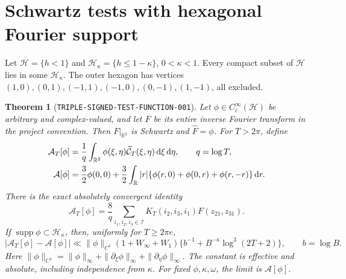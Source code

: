 \documentclass[11pt]{article}
\newtheorem{theorem}[lemma]{Theorem}
\newcommand{\dd}{\,\mathrm d}
\begin{document}
\section{Schwartz tests with hexagonal Fourier support}

Let \(\mathcal H=\{h<1\}\) and
\(\mathcal H_\kappa=\{h\leq1-\kappa\}\), \(0<\kappa<1\).
Every compact subset of \(\mathcal H\) lies in some
\(\mathcal H_\kappa\). The outer hexagon has vertices
\((1,0),(0,1),(-1,1),(-1,0),(0,-1),(1,-1)\), all excluded.

\begin{theorem}[\texttt{TRIPLE-SIGNED-TEST-FUNCTION-001}]
\label{thm:triple-signed-test-function}
Let \(\phi\in C_c^\infty(\mathcal H)\) be arbitrary and complex-valued,
and let \(F\) be its entire inverse Fourier transform in the project
convention. Then \(F|_{\mathbb R^2}\) is Schwartz and \(\widehat F=\phi\).
For \(T>2\pi\), define
\begin{align}
 \mathcal A_T[\phi]&=\frac1q\int_{\mathbb R^2}
             \phi(\xi,\eta)\widetilde{\mathcal C}_T(\xi,\eta)\dd\xi\dd\eta,
             \qquad q=\log T,\notag\\
 \mathcal A[\phi]&=\frac32\phi(0,0)+\frac32\int_{\mathbb R}|r|
       \{\phi(r,0)+\phi(0,r)+\phi(r,-r)\}\dd r.
       \label{eq:triple-signed-limit-functional}
\end{align}
There is the exact absolutely convergent identity
\begin{equation}\label{eq:triple-signed-zero-identity}
 \mathcal A_T[\phi]=\frac8q\sum_{i_1,i_2,i_3\in\mathcal I}
       K_T(i_2,i_3,i_1)F(z_{21},z_{31}).
\end{equation}
If \(\operatorname{supp}\phi\subset\mathcal H_\kappa\), then, uniformly
for \(T\geq2\pi e\),
\begin{equation}\label{eq:triple-signed-limit-error}
 |\mathcal A_T[\phi]-\mathcal A[\phi]|
 \ll \|\phi\|_{C^1}(1+W_\infty+W_1)
       \{b^{-1}+B^{-\kappa}\log^3(2T+2)\},\qquad b=\log B.
\end{equation}
Here \(\|\phi\|_{C^1}=\|\phi\|_\infty+
\|\partial_\xi\phi\|_\infty+\|\partial_\eta\phi\|_\infty\).
The constant is effective and absolute, including independence from
\(\kappa\). For fixed \(\phi,\kappa,\omega\), the limit is
\(\mathcal A[\phi]\).
\end{theorem}
\end{document}
